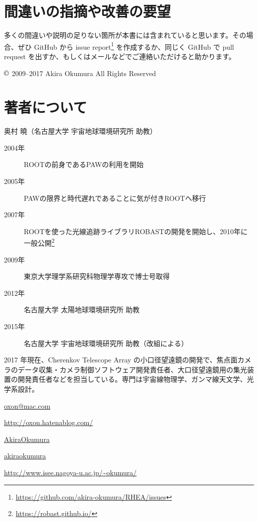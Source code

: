 \documentclass[oneside]{jsbook}
\makeatletter
\def\@listoflistenv{[NoFloat][listings][lstlisting]}
\newif\if@expire@floats \@expire@floatsfalse
\def\begin#1{%
   \@ifundefined{#1}%
      {\def\reserved@a{\@latex@error{Environment #1 undefined}\@eha}}%
      {\def\reserved@a{\def\@currenvir{#1}%
          \edef\@currenvline{\on@line}%
          \@check@listenv
          \csname #1\endcsname}}%
       \@ignorefalse
   \begingroup\@endpefalse\reserved@a}
\def\@check@listenv{%
   \@expandtwoargs\in@{[\@currenvir]}{\@listoflistenv}%
   \ifin@ \@expire@floatstrue \fi}
\makeatother
\begin{document}
\section*{間違いの指摘や改善の要望}
多くの間違いや説明の足りない箇所が本書には含まれていると思います。その場合、ぜひ GitHub から issue report\footnote{\url{https://github.com/akira-okumura/RHEA/issues}} を作成するか、同じく GitHub で pull request を出すか、もしくはメールなどでご連絡いただけると助かります。

\begin{flushright}
$\copyright$ 2009--2017 Akira Okumura All Rights Reserved
\end{flushright}

\pagebreak

\section*{著者について}
{\large 奥村 曉（名古屋大学 宇宙地球環境研究所 助教）}
         
\begin{description}
  \item[\quad2004年]ROOTの前身であるPAWの利用を開始
  \item[\quad2005年]PAWの限界と時代遅れであることに気が付きROOTへ移行
  \item[\quad2007年]ROOTを使った光線追跡ライブラリROBASTの開発を開始し、2010年に一般公開\footnote{\url{https://robast.github.io/}}
  \item[\quad2009年]東京大学理学系研究科物理学専攻で博士号取得
  \item[\quad2012年]名古屋大学 太陽地球環境研究所 助教
  \item[\quad2015年]名古屋大学 宇宙地球環境研究所 助教（改組による）
\end{description}

2017 年現在、Cherenkov Telescope Array の小口径望遠鏡の開発で、焦点面カメラのデータ収集・カメラ制御ソフトウェア開発責任者、大口径望遠鏡用の集光装置の開発責任者などを担当している。専門は宇宙線物理学、ガンマ線天文学、光学系設計。

\begin{description}[labelwidth=2.cm]
  \item[\quad 電子メール]\url{oxon@mac.com}
  \item[\quad blog]\url{http://oxon.hatenablog.com/}
  \item[\quad Twitter]\href{https://twitter.com/AkiraOkumura}{AkiraOkumura}
  \item[\quad Flickr]\href{https://www.flickr.com/photos/akiraokumura/}{akiraokumura}
  \item[\quad 個人ページ]\url{http://www.isee.nagoya-u.ac.jp/~okumura/}
\end{description}

\tableofcontents
\mainmatter














\end{document}
